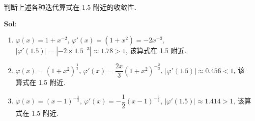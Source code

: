 判断上述各种迭代算式在 $1.5$ 附近的收敛性.

\textbf{Sol}:

\begin{enumerate}[(1)]
    \item $\varphi(x)=1+x^{-2}$, $\varphi'(x)=(1+x^2)=-2x^{-3}$, $|\varphi'(1.5)|=|-2\times 1.5^{-3}|\approx 1.78>1$, 该算式在 1.5 附近.
    \item $\varphi(x)=(1+x^2)^{\frac{1}{3}}$, $\varphi'(x)=\dfrac{2x}{3}(1+x^2)^{-\frac{2}{3}}$, $|\varphi'(1.5)|\approx 0.456 <1$, 该算式在 1.5 附近.
    \item $\varphi(x)=(x-1)^{-\frac{1}{2}}$, $\varphi'(x)=-\dfrac{1}{2}(x-1)^{-\frac{3}{2}}$, $|\varphi'(1.5)|\approx 1.414 > 1$, 该算式在 1.5 附近.
\end{enumerate}

\vspace{12pt}


